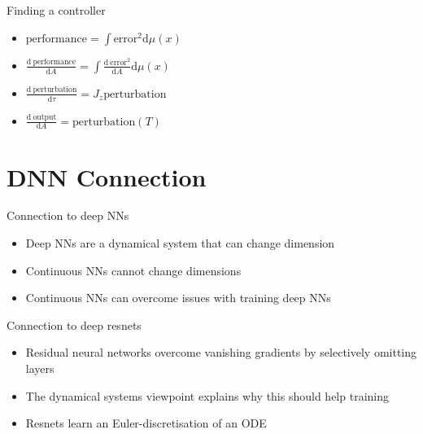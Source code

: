 \documentclass[presentation]{beamer}
\begin{document}
\begin{frame}[label={sec:org43bb638}]{Finding a controller}
\begin{itemize}
\item \(\mathrm{performance} = \int \mathrm{error}^2 \mathrm{d}\mu(x)\)
\end{itemize}

\vfill
\begin{itemize}
\item \(\frac{\mathrm{d~performance}}{\mathrm{d}A} = \int \frac{\mathrm{d~error}^2}{\mathrm{d}A} \mathrm{d}\mu(x)\)
\end{itemize}

\vfill
\begin{itemize}
\item \(\frac{\mathrm{d~perturbation}}{\mathrm{d}\tau} = J_z \mathrm{perturbation}\)
\end{itemize}

\vfill
\begin{itemize}
\item \(\frac{\mathrm{d~output}}{\mathrm{d}A} = \mathrm{perturbation}(T)\)
\end{itemize}
\end{frame}

\section{DNN Connection}
\label{sec:org7298f63}
\begin{frame}[label={sec:orgb86db5e}]{Connection to deep NNs}
\begin{itemize}
\item Deep NNs are a dynamical system that can change dimension
\end{itemize}
\vfill
\begin{itemize}
\item Continuous NNs cannot change dimensions
\end{itemize}
\vfill
\begin{itemize}
\item Continuous NNs can overcome issues with training deep NNs
\end{itemize}
\end{frame}

\begin{frame}[label={sec:orgb21df23}]{Connection to deep resnets}
\begin{itemize}
\item Residual neural networks overcome vanishing gradients by selectively omitting layers
\end{itemize}
\vfill
\begin{itemize}
\item The dynamical systems viewpoint explains why this should help training
\end{itemize}
\vfill
\begin{itemize}
\item Resnets learn an Euler-discretisation of an ODE
\end{itemize}
\end{frame}
\end{document}
